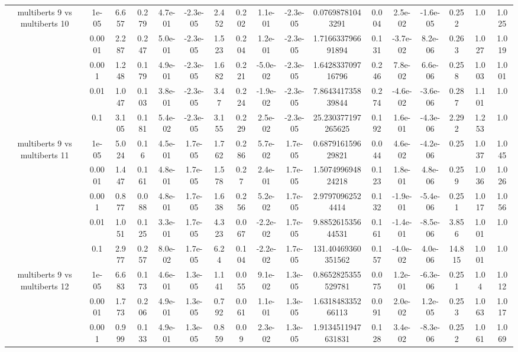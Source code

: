 \begin{tabular}{|c|c|c|c|c|c|c|c|c|c|c|c|c|c|c|c|c|}
\hline
\multirow{5}{*}{multiberts 9 vs multiberts 10} & 1e-05 & 6.657 & 0.279 & 4.7e-01 & -2.3e-05 & 2.452 & 0.202 & 1.1e-01 & -2.3e-05 & 0.07698781043291 & 0.004 & 2.5e-02 & -1.6e-05 & 0.252 & 1.0 & 1.025 \\
 & 0.0001 & 2.287 & 0.247 & 5.0e-01 & -2.3e-05 & 1.523 & 0.204 & 1.2e-01 & -2.3e-05 & 1.716633796691894 & 0.131 & -3.7e-02 & 8.2e-06 & 0.263 & 1.027 & 1.019 \\
 & 0.001 & 1.248 & 0.179 & 4.9e-01 & -2.3e-05 & 1.682 & 0.221 & -5.0e-02 & -2.3e-05 & 1.642833709716796 & 0.246 & 7.8e-02 & 6.6e-06 & 0.258 & 1.003 & 1.001 \\
 & 0.01 & 1.047 & 0.103 & 3.8e-01 & -2.3e-05 & 3.47 & 0.224 & -1.9e-02 & -2.3e-05 & 7.864341735839844 & 0.274 & -4.6e-02 & -3.6e-06 & 0.287 & 1.101 & 1.0 \\
 & 0.1 & 3.105 & 0.181 & 5.4e-02 & -2.3e-05 & 3.155 & 0.229 & 2.5e-02 & -2.3e-05 & 25.230377197265625 & 0.192 & 1.6e-01 & -4.3e-06 & 2.292 & 1.253 & 1.0 \\
\hline
\multirow{5}{*}{multiberts 9 vs multiberts 11} & 1e-05 & 5.024 & 0.16 & 4.5e-01 & 1.7e-05 & 1.762 & 0.286 & 5.7e-02 & 1.7e-05 & 0.687916159629821 & 0.044 & 4.6e-02 & -4.2e-06 & 0.25 & 1.037 & 1.045 \\
 & 0.0001 & 1.447 & 0.161 & 4.8e-01 & 1.7e-05 & 1.578 & 0.27 & 2.4e-01 & 1.7e-05 & 1.507499694824218 & 0.123 & 1.8e-01 & 4.8e-06 & 0.259 & 1.036 & 1.026 \\
 & 0.001 & 0.877 & 0.088 & 4.8e-01 & 1.7e-05 & 1.638 & 0.256 & 5.2e-02 & 1.7e-05 & 2.97970962524414 & 0.132 & -1.9e-01 & -5.4e-06 & 0.251 & 1.017 & 1.056 \\
 & 0.01 & 1.051 & 0.125 & 3.3e-01 & 1.7e-05 & 4.323 & 0.067 & -2.2e-02 & 1.7e-05 & 9.885261535644531 & 0.161 & -1.4e-01 & -8.5e-06 & 3.856 & 1.001 & 1.0 \\
 & 0.1 & 2.977 & 0.257 & 8.0e-02 & 1.7e-05 & 6.24 & 0.104 & -2.2e-02 & 1.7e-05 & 131.40469360351562 & 0.157 & -4.0e-02 & 4.0e-06 & 14.815 & 1.001 & 1.0 \\
\hline
\multirow{5}{*}{multiberts 9 vs multiberts 12} & 1e-05 & 6.683 & 0.173 & 4.6e-01 & 1.3e-05 & 1.141 & 0.055 & 9.1e-02 & 1.3e-05 & 0.8652825355529781 & 0.075 & 1.2e-01 & -6.3e-06 & 0.251 & 1.04 & 1.012 \\
 & 0.0001 & 1.773 & 0.206 & 4.9e-01 & 1.3e-05 & 0.792 & 0.061 & 1.1e-01 & 1.3e-05 & 1.631848335266113 & 0.091 & 2.0e-02 & 1.2e-05 & 0.253 & 1.063 & 1.017 \\
 & 0.001 & 0.999 & 0.133 & 4.9e-01 & 1.3e-05 & 0.859 & 0.09 & 2.3e-02 & 1.3e-05 & 1.9134511947631831 & 0.128 & 3.4e-02 & -8.3e-06 & 0.252 & 1.061 & 1.069 \\

\end{tabular}
